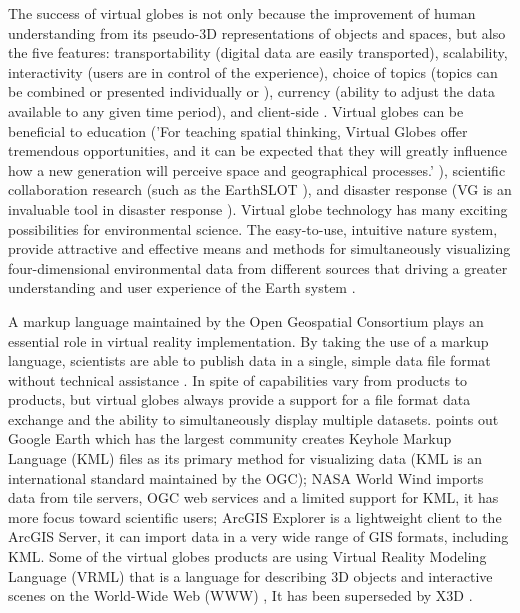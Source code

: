 The success of virtual globes \cite{tuttle.virtual-globes.2008} is not only because the improvement of human understanding from its pseudo-3D representations of objects and spaces, but also the five features: transportability (digital data are easily transported), scalability, interactivity (users are in control of the experience), choice of topics (topics can be combined or presented individually or ), currency (ability to adjust the data available to any given time period), and client-side \cite{tuttle.virtual-globes.2008}. Virtual globes can be beneficial to education ('For teaching spatial thinking, Virtual Globes offer tremendous opportunities, and it can be expected that they will greatly influence how a new generation will perceive space and geographical processes.' \cite{nuernberger.vr-classroom.2006}), scientific collaboration research (such as the EarthSLOT \cite{earthslot.2016}), and disaster response (VG is an invaluable tool in disaster response \cite{butler.vg.2006, nourbakhsh.mapping-disaster-zones.2006}). Virtual globe technology has many exciting possibilities for environmental science. The easy-to-use, intuitive nature system, provide attractive and effective means and methods for simultaneously visualizing four-dimensional environmental data from different sources that driving a greater understanding and user experience of the Earth system \cite{blower.sharing-visualizing.2007}. 

A markup language maintained by the Open Geospatial Consortium \cite{ogc.2016} plays an essential role in virtual reality implementation. By taking the use of a markup language, scientists are able to publish data in a single, simple data file format without technical assistance \cite{blower.sharing-visualizing.2007}. In spite of capabilities vary from products to products, but virtual globes always provide a support for a file format data exchange and the ability to simultaneously display multiple datasets. \cite{blower.sharing-visualizing.2007} points out Google Earth which has the largest community creates Keyhole Markup Language (KML) \cite{google.kml.2016} files as its primary method for visualizing data (KML is an international standard maintained by the OGC); NASA World Wind \cite{nasa.world-wind.2016} imports data from tile servers, OGC web services and a limited support for KML, it has more focus toward scientific users; ArcGIS Explorer \cite{esri.arcgis-explorer.2016} is a lightweight client to the ArcGIS Server, it can import data in a very wide range of GIS formats, including KML. Some of the virtual globes products are using Virtual Reality Modeling Language (VRML) \cite{wiki.vrml.2016} that is a language for describing 3D objects and interactive scenes on the World-Wide Web (WWW) \cite{wiki.www.2016}, It has been superseded by X3D \cite{wiki.x3d.2016}.

